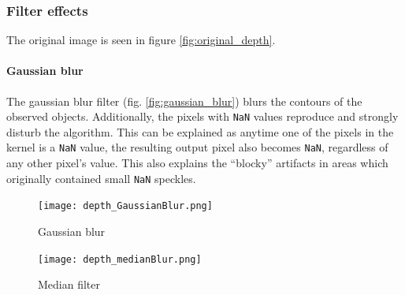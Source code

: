 \documentclass[DIV12,a4paper]{scrartcl}
\begin{document}

\subsubsection{Filter effects}
\label{sec:filter_effects}
The original image is seen in figure \ref{fig:original_depth}.

\paragraph{Gaussian blur}
The gaussian blur filter (fig. \ref{fig:gaussian_blur}) blurs the contours of the observed objects. Additionally, the pixels with \texttt{NaN} values reproduce and strongly disturb the algorithm. This can be explained as anytime one of the pixels in the kernel is a \texttt{NaN} value, the resulting  output pixel also becomes \texttt{NaN}, regardless of any other pixel's value. This also explains the ``blocky'' artifacts in areas which originally contained small \texttt{NaN} speckles.
\begin{figure}[h!tbp]
  \centering
  \begin{minipage}{.5\textwidth}
    \centering
    \texttt{[image: depth\_GaussianBlur.png]}
    \caption{Gaussian blur}
    \label{fig:gaussian_blur}
  \end{minipage}%
  \begin{minipage}{.5\textwidth}
    \centering
    \texttt{[image: depth\_medianBlur.png]}
    \caption{Median filter}
    \label{fig:median_depth}
  \end{minipage}
\end{figure}
\end{document}
